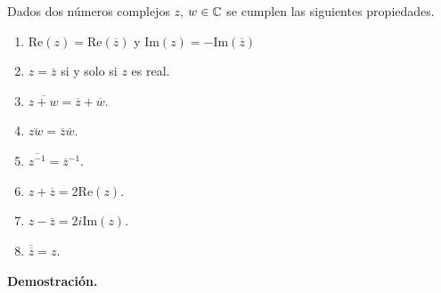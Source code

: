 \begin{prop}
Dados dos números complejos $z$, $w\in\mathbb{C}$ se cumplen las siguientes propiedades.
\begin{enumerate}
	\item Re$(z) = \mbox{Re}(\overline{z})$ y Im$(z) = - \mbox{Im}(\overline{z})$
	\item $z = \overline{z}$ si y solo si $z$ es real.
	\item $\overline{z + w} = \overline{z} + \overline{w}$.
	\item $\overline{z w} = \overline{z}  \overline{w}$.
        \item $\overline{z^{-1}}=\overline{z}^{-1}$.
	\item $z + \overline{z} = 2 \mbox{Re}(z)$.
	\item $z - \overline{z} = 2 i \mbox{Im}(z)$.
	\item $\overline{\overline{z}} = z$.
\end{enumerate}
\end{prop}
{\bf Demostración.}
